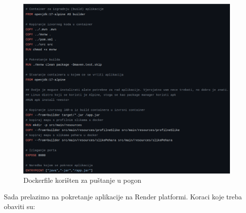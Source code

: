 \begin{figure}[H]
	\includegraphics[scale=0.4]{slike/deployment2.png}
	\centering
	\caption{Dockerfile korišten za puštanje u pogon}
	\label{deployment2}
\end{figure}

Sada prelazimo na pokretanje aplikacije na Render platformi. Koraci koje treba obaviti su: 

